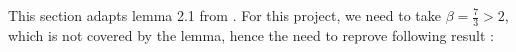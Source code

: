 \documentclass[a4paper]{article}
\newtheorem{thm}[Theo]{Théorème}
\newcommand{\N}{\mathbb{N}}
\newcommand{\Q}{\mathbb{Q}}
\theoremstyle{definition}
\begin{document}


This section adapts lemma 2.1 from \cite{lemma}. For this project, we need to take $\beta = \frac{7}{3} > 2$, which is not covered by the lemma, hence the need to reprove following result :
	
\end{document}
